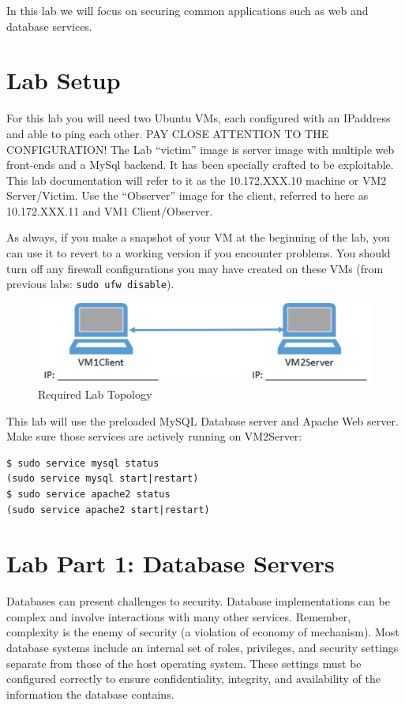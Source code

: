 \documentclass{article}
\begin{document}
In this lab we will focus on securing common applications 
such as web and database services.  

\section{Lab Setup}
For this lab you will need two Ubuntu VMs, each configured with an IPaddress and able to ping each other. PAY CLOSE ATTENTION TO THE CONFIGURATION!  The Lab ``victim'' image is server image with multiple web front-ends and a MySql backend.  It has been specially crafted to be exploitable.  This lab documentation will refer to it as the 10.172.XXX.10 machine or VM2 Server/Victim.    Use the ``Observer'' image for the client, referred to here as 10.172.XXX.11 and VM1 Client/Observer.  

As always, 
if you make a snapshot of your VM at the beginning of the lab, you can use it 
to revert to a working version if you encounter problems.  You should 
turn off any firewall configurations you may have created on these VMs (from previous labs: {\tt sudo ufw disable}).  

\begin{figure}[h]
    \centering
    \includegraphics*[width=.6\textwidth]{figs/labtopology172.png}
    \caption{Required Lab Topology}
    \label{fig:labtopology}
\end{figure}

This lab will use the preloaded MySQL Database server and Apache Web server.
Make sure those services are actively running on VM2Server:  

\begin{Verbatim}[frame=single] 
$ sudo service mysql status  
(sudo service mysql start|restart)
$ sudo service apache2 status 
(sudo service apache2 start|restart)
\end{Verbatim}



\section{Lab Part 1: Database Servers}

Databases can present challenges to security. Database implementations can be complex and involve interactions with many other services. Remember, complexity is the enemy of security (a violation of economy of mechanism). Most database systems include an internal set of roles, privileges, and security settings separate from those of the host operating system. These settings must be configured correctly to ensure confidentiality, integrity, and availability of the information the database contains. 
\end{document}
